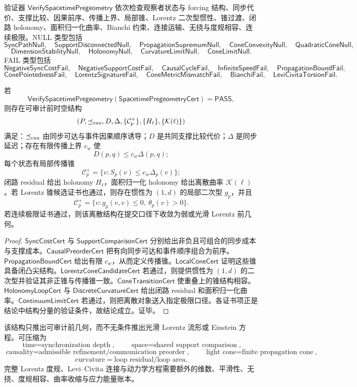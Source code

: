 验证器 \(\mathsf{VerifySpacetimePregeometry}\) 依次检查观察者状态与 forcing 结构、同步代价、支撑比较、因果前序、传播上界、局部锥、Lorentz 二次型惯性、锥过渡、闭路 holonomy、面积归一化曲率、Bianchi 约束、连接运输、无挠与度规相容、连续极限。NULL 类型包括
\[
\mathsf{SyncPathNull},\quad
\mathsf{SupportDisconnectedNull},\quad
\mathsf{PropagationSupremumNull},\quad
\mathsf{ConeConvexityNull},\quad
\mathsf{QuadraticConeNull},
\]
\[
\mathsf{DimensionStabilityNull},\quad
\mathsf{HolonomyNull},\quad
\mathsf{CurvatureLimitNull},\quad
\mathsf{ConeLimitNull}.
\]
FAIL 类型包括
\[
\mathsf{NegativeSyncCostFail},\quad
\mathsf{NegativeSupportCostFail},\quad
\mathsf{CausalCycleFail},\quad
\mathsf{InfiniteSpeedFail},\quad
\mathsf{PropagationBoundFail},
\]
\[
\mathsf{ConePointednessFail},\quad
\mathsf{LorentzSignatureFail},\quad
\mathsf{ConeMetricMismatchFail},\quad
\mathsf{BianchiFail},\quad
\mathsf{LeviCivitaTorsionFail}.
\]

\begin{theorem}\label{thm:typed-address-biaxial-completion-spacetime-pregeometry-soundness}
若
\[
\mathsf{VerifySpacetimePregeometry}
(\mathsf{SpacetimePregeometryCert})
=
\mathsf{PASS},
\]
则存在可审计前时空结构
\[
(P,\preceq_{\rm cau},D,\Delta,\{\mathcal C_p^+\},\{H_\ell\},\{\mathcal K(\ell)\})
\]
满足：\(\preceq_{\rm cau}\) 由同步可达与事件因果顺序诱导；\(D\) 是共同支撑比较代价；\(\Delta\) 是同步延迟；存在有限传播上界 \(c_w\) 使
\[
D(p,q)\le c_w\Delta(p,q);
\]
每个状态有局部传播锥
\[
\mathcal C_p^+=\{v:S_p(v)\le c_w\Delta_p(v)\};
\]
闭路 residual 给出 holonomy \(H_\ell\)，面积归一化 holonomy 给出离散曲率 \(\mathcal K(\ell)\)。若 Lorentz 锥候选证书也通过，则存在惯性为 \((1,d)\) 的局部二次型 \(g_p\)，并且
\[
\mathcal C_p^+=\{v:g_p(v,v)\le0,\ \theta_p(v)>0\}.
\]
若连续极限证书通过，则该离散结构在提交口径下收敛为弱或光滑 Lorentz 前几何。
\end{theorem}
\begin{proof}
\(\mathsf{SyncCostCert}\) 与 \(\mathsf{SupportComparisonCert}\) 分别给出非负且可组合的同步成本与支撑成本。\(\mathsf{CausalPreorderCert}\) 把有向同步可达和事件顺序组合为前序。\(\mathsf{PropagationBoundCert}\) 给出有限 \(c_w\)，从而定义传播锥。\(\mathsf{LocalConeCert}\) 证明这些锥具备闭凸尖结构。\(\mathsf{LorentzConeCandidateCert}\) 若通过，则提供惯性为 \((1,d)\) 的二次型并验证其非正锥与传播锥一致。\(\mathsf{ConeTransitionCert}\) 使重叠上的锥结构相容。\(\mathsf{HolonomyLoopCert}\) 与 \(\mathsf{DiscreteCurvatureCert}\) 给出闭路 residual 和面积归一化曲率。\(\mathsf{ContinuumLimitCert}\) 若通过，则把离散对象送入指定极限口径。各证书项正是结论中结构分量的验证条件，故结论成立。证毕。
\end{proof}

该结构只推出可审计前几何，而不无条件推出光滑 Lorentz 流形或 Einstein 方程。可压缩为
\[
\boxed{\text{time}=\text{synchronization depth}},
\qquad
\boxed{\text{space}=\text{shared support comparison}},
\]
\[
\boxed{\text{causality}=\text{admissible refinement/communication preorder}},
\qquad
\boxed{\text{light cone}=\text{finite propagation cone}},
\]
\[
\boxed{\text{curvature}=\text{loop residual}/\text{loop area}}.
\]
完整 Lorentz 度规、Levi--Civita 连接与动力学方程需要额外的维数、平滑性、无挠、度规相容、曲率收缩与应力能量账本。

